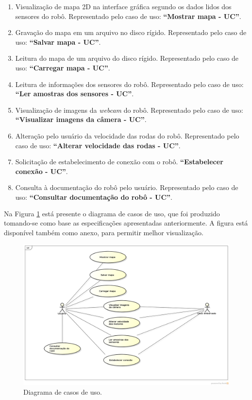 \begin{enumerate}[topsep=0pt, partopsep=0pt, itemsep=0pt]
  \item Visualização de mapa 2D na interface gráfica segundo os dados lidos dos sensores do robô. Representado pelo caso de uso: \textbf{``Mostrar mapa - UC''}.
  \item Gravação do mapa em um arquivo no disco rígido. Representado pelo caso de uso: \textbf{``Salvar mapa - UC''}. 
  \item Leitura do mapa de um arquivo do disco rígido. Representado pelo caso de uso: \textbf{``Carregar mapa - UC''}.
  \item Leitura de informações dos sensores do robô. Representado pelo caso de uso: \textbf{``Ler amostras dos sensores - UC''}.
  \item Visualização de imagens da \textit{webcam} do robô. Representado pelo caso de uso: \textbf{``Visualizar imagens da câmera - UC''}.
  \item Alteração pelo usuário da velocidade das rodas do robô. Representado pelo caso de uso: \textbf{``Alterar velocidade das rodas - UC''}.
  \item Solicitação de estabelecimento de conexão com o robô. \textbf{``Estabelecer conexão - UC''}.
  \item Consulta à documentação do robô pelo usuário. Representado pelo caso de uso: \textbf{``Consultar documentação do robô - UC''}.
\end{enumerate}

Na Figura \ref{fig:diagrama_casos_de_uso} está presente o diagrama de casos de uso, que foi produzido tomando-se como base as especificações apresentadas anteriormente. A figura está disponível também como anexo, para permitir melhor visualização.

\begin{figure}[h]
  \centering
  \includegraphics[width=\textwidth, keepaspectratio]{./figuras/diagrama_casos_de_uso.png}
  \caption{Diagrama de casos de uso.}
  \label{fig:diagrama_casos_de_uso}
\end{figure}

